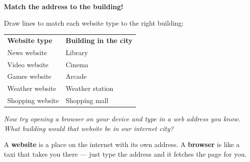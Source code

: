 \begin{tryit}
  \textbf{Match the address to the building!}

  Draw lines to match each website type to the right building:

  \begin{center}
    \begin{tabular}{ll}
      \textbf{Website type} & \textbf{Building in the city} \\[4pt]
      News website          & Library \\
      Video website         & Cinema \\
      Games website         & Arcade \\
      Weather website       & Weather station \\
      Shopping website      & Shopping mall \\
    \end{tabular}
  \end{center}

  \emph{Now try opening a browser on your device and type in a web address you know.
  What building would that website be in our internet city?}
\end{tryit}

\sectionrule

\begin{bigidea}
  A \textbf{website} is a place on the internet with its own address.
  A \textbf{browser} is like a taxi that takes you there —
  just type the address and it fetches the page for you.
\end{bigidea}

